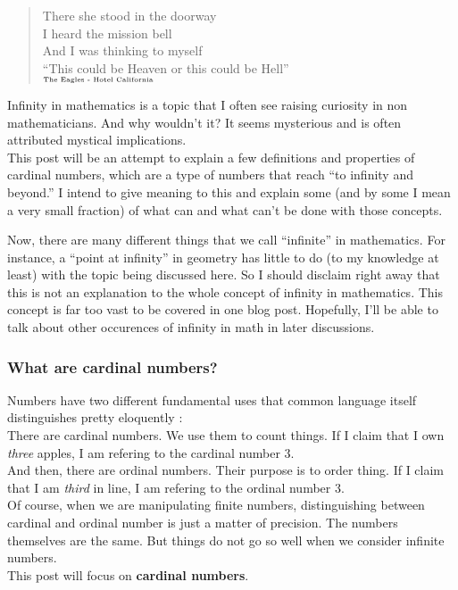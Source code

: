 \documentclass[
]{article}
\author{}
\date{}
\begin{document}
{
\setcounter{tocdepth}{3}
\tableofcontents
}
\begin{quote}
There she stood in the doorway\\
I heard the mission bell\\
And I was thinking to myself\\
``This could be Heaven or this could be Hell''\\
\(\tiny{\text{The Eagles - Hotel California}}\)
\end{quote}

Infinity in mathematics is a topic that I often see raising curiosity in
non mathematicians. And why wouldn't it? It seems mysterious and is
often attributed mystical implications.\\
This post will be an attempt to explain a few definitions and properties
of cardinal numbers, which are a type of numbers that reach ``to
infinity and beyond.'' I intend to give meaning to this and explain some
(and by some I mean a very small fraction) of what can and what can't be
done with those concepts.

Now, there are many different things that we call ``infinite'' in
mathematics. For instance, a ``point at infinity'' in geometry has
little to do (to my knowledge at least) with the topic being discussed
here. So I should disclaim right away that this is not an explanation to
the whole concept of infinity in mathematics. This concept is far too
vast to be covered in one blog post. Hopefully, I'll be able to talk
about other occurences of infinity in math in later discussions.

\hypertarget{what-are-cardinal-numbers}{%
\subsubsection{What are cardinal
numbers?}\label{what-are-cardinal-numbers}}

Numbers have two different fundamental uses that common language itself
distinguishes pretty eloquently :\\
There are cardinal numbers. We use them to count things. If I claim that
I own \emph{three} apples, I am refering to the cardinal number 3.\\
And then, there are ordinal numbers. Their purpose is to order thing. If
I claim that I am \emph{third} in line, I am refering to the ordinal
number 3.\\
Of course, when we are manipulating finite numbers, distinguishing
between cardinal and ordinal number is just a matter of precision. The
numbers themselves are the same. But things do not go so well when we
consider infinite numbers.\\
This post will focus on \textbf{cardinal numbers}.
\end{document}
